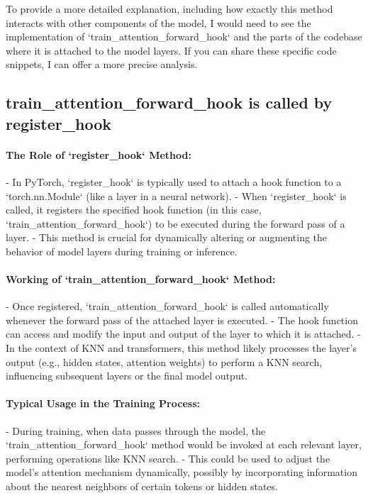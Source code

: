 \documentclass[12pt]{article}
\begin{document}
To provide a more detailed explanation, including how exactly this method
interacts with other components of the model, I would need to see the
implementation of `train\_attention\_forward\_hook` and the parts of the
codebase where it is attached to the model layers. If you can share these
specific code snippets, I can offer a more precise analysis.

\subsection*{train\_attention\_forward\_hook is called by register\_hook}

\paragraph{The Role of `register\_hook` Method:}
- In PyTorch, `register\_hook` is typically used to attach a hook function to a
`torch.nn.Module` (like a layer in a neural network). - When `register\_hook`
is called, it registers the specified hook function (in this case,
`train\_attention\_forward\_hook`) to be executed during the forward pass of a
layer. - This method is crucial for dynamically altering or augmenting the
behavior of model layers during training or inference.

\paragraph{Working of `train\_attention\_forward\_hook` Method:}
- Once registered, `train\_attention\_forward\_hook` is called automatically
whenever the forward pass of the attached layer is executed. - The hook
function can access and modify the input and output of the layer to which it
is attached. - In the context of KNN and transformers, this method likely
processes the layer’s output (e.g., hidden states, attention weights) to
perform a KNN search, influencing subsequent layers or the final model
output.

\paragraph{Typical Usage in the Training Process:}
- During training, when data passes through the model, the
`train\_attention\_forward\_hook` method would be invoked at each relevant
layer, performing operations like KNN search. - This could be used to adjust
the model's attention mechanism dynamically, possibly by incorporating
information about the nearest neighbors of certain tokens or hidden states.
\end{document}

